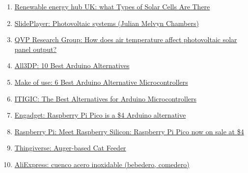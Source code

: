 \documentclass[12pt]{article}
\begin{document}
\begin{enumerate}
			\item 
			\label{bib: renewable energy hub main types photo cells}
			\href{https://www.renewableenergyhub.co.uk/main/solar-panels/types-of-solar-cell/}{Renewable energy hub UK: what Types of Solar Cells Are There}
			
			\item 
			\label{bib: SlidePlayer Photovoltaic systems}
			\href{https://slideplayer.com/slide/9144319/}{SlidePlayer: Photovoltaic systems (Julian Melvyn Chambers)}
			
			\item 
			\label{bib: QVP air temp affect solar panel output}
			\href{https://www.qpvgroup.org/blog/2019/2/3/how-does-air-temperature-affect-photovoltaic-solar-panel-output}{QVP Research Group: How does air temperature affect photovoltaic solar panel output?}
			
			\item 
			\label{bib: arduino alternatives}
			\href{https://all3dp.com/2/best-arduino-alternatives/}{All3DP: 10 Best Arduino Alternatives}
			
			\item 
			\label{bib: microcontrollers alternative to arduino}
			\href{https://www.makeuseof.com/tag/best-arduino-alternative-microcontrollers/}{Make of use: 6 Best Arduino Alternative Microcontrollers}
			
			\item 
			\label{bib: alternative to arduino}
			\href{https://itigic.com/best-alternatives-for-arduino-microcontrollers/}{ITIGIC: The Best Alternatives for Arduino Microcontrollers}
			
			\item 
			\label{bib: raspberry pi pico}
			\href{https://www.engadget.com/raspberry-pi-pico-microcontroller-154235348.html?guccounter=1}{Engadget: Raspberry Pi Pico is a \$4 Arduino alternative}
			
						
			\item 
			\label{bib: raspberry pi pico 2}
			\href{https://www.raspberrypi.org/blog/raspberry-pi-silicon-pico-now-on-sale/}{Raspberry Pi: Meet Raspberry Silicon: Raspberry Pi Pico now on sale at \$4}
			
						
			\item 
			\label{bib: thingiverse helices comedero}
			\href{https://www.thingiverse.com/thing:27854}{Thingiverse: Auger-based Cat Feeder}
			
						
			\item 
			\label{bib: AliExpress cuenco}
			\href{https://es.aliexpress.com/item/1005001632098703.html?spm=a2g0s.9042311.0.0.274263c05XMd1Y}{AliExpress: cuenco acero inoxidable (bebedero, comedero)}
			

\end{enumerate}
\end{document}
